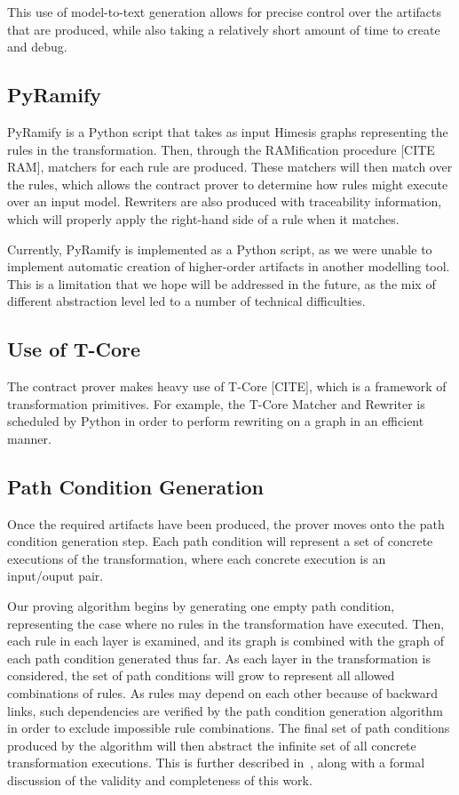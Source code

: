 This use of model-to-text generation allows for precise control over the artifacts that are produced, while also taking a relatively short amount of time to create and debug.

\subsection{PyRamify}

PyRamify is a Python script that takes as input Himesis graphs representing the rules in the transformation. Then, through the RAMification procedure [CITE RAM], matchers for each rule are produced. These matchers will then match over the rules, which allows the contract prover to determine how rules might execute over an input model. Rewriters are also produced with traceability information, which will properly apply the right-hand side of a rule when it matches.

Currently, PyRamify is implemented as a Python script, as we were unable to implement automatic creation of higher-order artifacts in another modelling tool. This is a limitation that we hope will be addressed in the future, as the mix of different abstraction level led to a number of technical difficulties.

\subsection{Use of T-Core}

The contract prover makes heavy use of T-Core [CITE], which is a framework of transformation primitives. For example, the T-Core Matcher and Rewriter is scheduled by Python in order to perform rewriting on a graph in an efficient manner.


\subsection{Path Condition Generation}

Once the required artifacts have been produced, the prover moves onto the path condition generation step.  Each
path condition will represent a set of concrete executions
of the transformation, where each concrete execution is an
input/ouput pair.

Our proving algorithm begins by generating one empty
path condition, representing the case where no rules in the
transformation have executed. Then, each rule in each layer
is examined, and its graph is combined with the graph of
each path condition generated thus far. As each layer in the
transformation is considered, the set of path conditions will
grow to represent all allowed combinations of rules. As rules
may depend on each other because of backward links, such
dependencies are verified by the path condition generation
algorithm in order to exclude impossible rule combinations.
The final set of path conditions produced by the algorithm
will then abstract the infinite set of all concrete transformation
executions. This is further described in~\cite{Lucio2014}, along with a
formal discussion of the validity and completeness of this
work.

